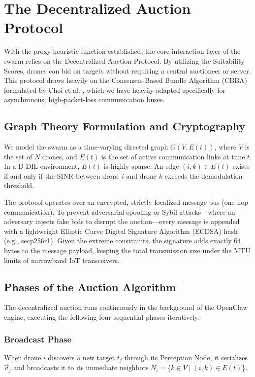 \section{The Decentralized Auction Protocol}

With the proxy heuristic function established, the core interaction layer of the swarm relies on the Decentralized Auction Protocol. By utilizing the Suitability Scores, drones can bid on targets without requiring a central auctioneer or server. This protocol draws heavily on the Consensus-Based Bundle Algorithm (CBBA) formulated by Choi et al. \cite{choi2009}, which we have heavily adapted specifically for asynchronous, high-packet-loss communication buses.

\subsection{Graph Theory Formulation and Cryptography}
We model the swarm as a time-varying directed graph $G(V, E(t))$, where $V$ is the set of $N$ drones, and $E(t)$ is the set of active communication links at time $t$. In a D-DIL environment, $E(t)$ is highly sparse. An edge $(i, k) \in E(t)$ exists if and only if the SINR between drone $i$ and drone $k$ exceeds the demodulation threshold. 

The protocol operates over an encrypted, strictly localized message bus (one-hop communication). To prevent adversarial spoofing or Sybil attacks—where an adversary injects fake bids to disrupt the auction—every message is appended with a lightweight Elliptic Curve Digital Signature Algorithm (ECDSA) hash (e.g., secp256r1). Given the extreme constraints, the signature adds exactly 64 bytes to the message payload, keeping the total transmission size under the MTU limits of narrowband IoT transceivers.

\subsection{Phases of the Auction Algorithm}
The decentralized auction runs continuously in the background of the OpenClaw engine, executing the following four sequential phases iteratively:

\subsubsection{Broadcast Phase}
When drone $i$ discovers a new target $t_j$ through its Perception Node, it serializes $\vec{v}_j$ and broadcasts it to its immediate neighbors $N_i = \{k \in V \mid (i,k) \in E(t)\}$. 

